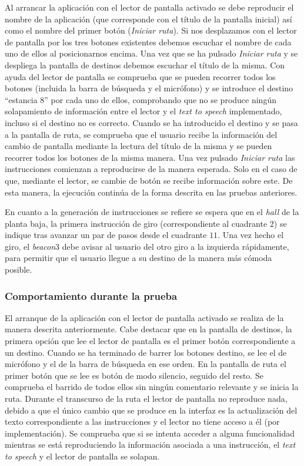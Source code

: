 Al arrancar la aplicación con el lector de pantalla activado se debe reproducir el nombre de la aplicación (que corresponde con el título de la pantalla inicial) así como el nombre del primer botón (\textit{Iniciar ruta}). Si nos desplazamos con el lector de pantalla por los tres botones existentes debemos escuchar el nombre de cada uno de ellos al posicionarnos encima. Una vez que se ha pulsado \textit{Iniciar ruta} y se despliega la pantalla de destinos debemos escuchar el título de la misma. Con ayuda del lector de pantalla se comprueba que se pueden recorrer todos los botones (incluida la barra de búsqueda y el micrófono) y se introduce el destino ``estancia 8'' por cada uno de ellos, comprobando que no se produce ningún solapamiento de información entre el lector y el \textit{text to speech} implementado, incluso si el destino no es correcto. Cuando se ha introducido el destino y se pasa a la pantalla de ruta, se comprueba que el usuario recibe la información del cambio de pantalla mediante la lectura del título de la misma y se pueden recorrer todos los botones de la misma manera. Una vez pulsado \textit{Iniciar ruta} las instrucciones comienzan a reproducirse de la manera esperada. Solo en el caso de que, mediante el lector, se cambie de botón se recibe información sobre este. De esta manera, la ejecución continúa de la forma descrita en las pruebas anteriores.  

En cuanto a la generación de instrucciones se refiere se espera que en el \textit{hall} de la planta baja, la primera instrucción de giro (correspondiente al cuadrante $2$) se indique tras avanzar un par de pasos desde el cuadrante $11$. Una vez hecho el giro, el \textit{beacon$3$} debe avisar al usuario del otro giro a la izquierda rápidamente, para permitir que el usuario llegue a su destino de la manera más cómoda posible.

\subsubsection*{Comportamiento durante la prueba}

El arranque de la aplicación con el lector de pantalla activado se realiza de la manera descrita anteriormente. Cabe destacar que en la pantalla de destinos, la primera opción que lee el lector de pantalla es el primer botón correspondiente a un destino. Cuando se ha terminado de barrer los botones destino, se lee el de micrófono y el de la barra de búsqueda en ese orden. En la pantalla de ruta el primer botón que se lee es botón de modo silencio, seguido del resto. Se comprueba el barrido de todos ellos sin ningún comentario relevante y se inicia la ruta. Durante el transcurso de la ruta el lector de pantalla no reproduce nada, debido a que el único cambio que se produce en la interfaz es la actualización del texto correspondiente a las instrucciones y el lector no tiene acceso a él (por implementación). Se comprueba que si se intenta acceder a alguna funcionalidad mientras se está reproduciendo la información asociada a una instrucción, el \textit{text to speech} y el lector de pantalla se solapan. 

